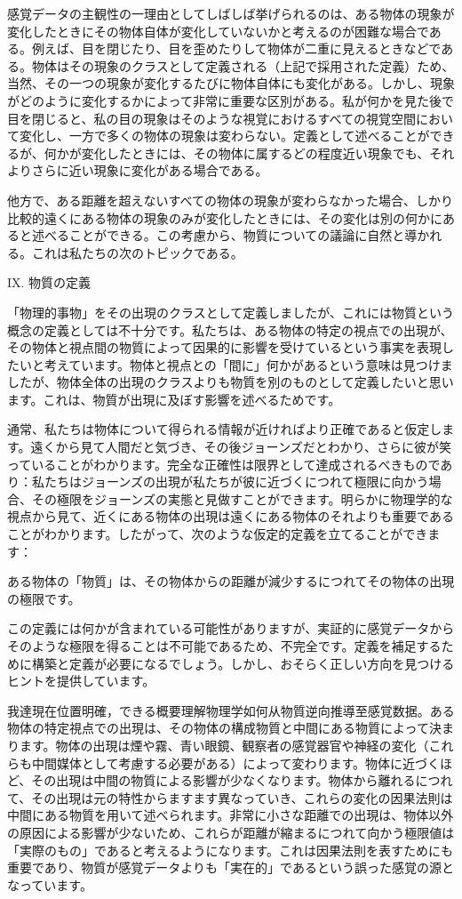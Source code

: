 \documentclass[a4paper,11pt,openany]{ltjsbook}
\begin{document}
感覚データの主観性の一理由としてしばしば挙げられるのは、ある物体の現象が変化したときにその物体自体が変化していないかと考えるのが困難な場合である。例えば、目を閉じたり、目を歪めたりして物体が二重に見えるときなどである。物体はその現象のクラスとして定義される（上記で採用された定義）ため、当然、その一つの現象が変化するたびに物体自体にも変化がある。しかし、現象がどのように変化するかによって非常に重要な区別がある。私が何かを見た後で目を閉じると、私の目の現象はそのような視覚におけるすべての視覚空間において変化し、一方で多くの物体の現象は変わらない。定義として述べることができるが、何かが変化したときには、その物体に属するどの程度近い現象でも、それよりさらに近い現象に変化がある場合である。

他方で、ある距離を超えないすべての物体の現象が変わらなかった場合、しかり比較的遠くにある物体の現象のみが変化したときには、その変化は別の何かにあると述べることができる。この考慮から、物質についての議論に自然と導かれる。これは私たちの次のトピックである。

IX. 物質の定義

「物理的事物」をその出現のクラスとして定義しましたが、これには物質という概念の定義としては不十分です。私たちは、ある物体の特定の視点での出現が、その物体と視点間の物質によって因果的に影響を受けているという事実を表現したいと考えています。物体と視点との「間に」何かがあるという意味は見つけましたが、物体全体の出現のクラスよりも物質を別のものとして定義したいと思います。これは、物質が出現に及ぼす影響を述べるためです。

通常、私たちは物体について得られる情報が近ければより正確であると仮定します。遠くから見て人間だと気づき、その後ジョーンズだとわかり、さらに彼が笑っていることがわかります。完全な正確性は限界として達成されるべきものであり：私たちはジョーンズの出現が私たちが彼に近づくにつれて極限に向かう場合、その極限をジョーンズの実態と見做すことができます。明らかに物理学的な視点から見て、近くにある物体の出現は遠くにある物体のそれよりも重要であることがわかります。したがって、次のような仮定的定義を立てることができます：

ある物体の「物質」は、その物体からの距離が減少するにつれてその物体の出現の極限です。

この定義には何かが含まれている可能性がありますが、実証的に感覚データからそのような極限を得ることは不可能であるため、不完全です。定義を補足するために構築と定義が必要になるでしょう。しかし、おそらく正しい方向を見つけるヒントを提供しています。

我達現在位置明確，できる概要理解物理学如何从物質逆向推導至感覚数据。ある物体の特定視点での出現は、その物体の構成物質と中間にある物質によって決まります。物体の出現は煙や霧、青い眼鏡、観察者の感覚器官や神経の変化（これらも中間媒体として考慮する必要がある）によって変わります。物体に近づくほど、その出現は中間の物質による影響が少なくなります。物体から離れるにつれて、その出現は元の特性からますます異なっていき、これらの変化の因果法則は中間にある物質を用いて述べられます。非常に小さな距離での出現は、物体以外の原因による影響が少ないため、これらが距離が縮まるにつれて向かう極限値は「実際のもの」であると考えるようになります。これは因果法則を表すためにも重要であり、物質が感覚データよりも「実在的」であるという誤った感覚の源となっています。
\end{document}
